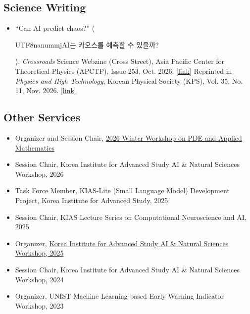 \documentclass[11pt,a4paper]{article}
\begin{document}
\subsection*{Science Writing}

\begin{itemize}[leftmargin=1.5em, topsep=0.2em, itemsep=0.2em]
    \item ``Can AI predict chaos?'' (\begin{CJK}{UTF8}{nanummj}AI는 카오스를 예측할 수 있을까?\end{CJK}), \textit{Crossroads} Science Webzine (Cross Street), Asia Pacific Center for Theoretical Physics (APCTP), Issue 253, Oct. 2026. \href{https://crossroads.apctp.org/cop/bbs/000000000000/selectArticleDetail.do?nttId=4385}{[link]} Reprinted in \textit{Physics and High Technology}, Korean Physical Society (KPS), Vol. 35, No. 11, Nov. 2026. \href{https://webzine.kps.or.kr/?p=5_view&idx=17284}{[link]}
\end{itemize}

\subsection*{Other Services}

\begin{itemize}[leftmargin=1.5em, topsep=0.2em, itemsep=0.2em]
    \item Organizer and Session Chair, \href{https://symposia.kias.re.kr/2026PDEMATH/}{2026 Winter Workshop on PDE and Applied Mathematics}
    
    \item Session Chair, Korea Institute for Advanced Study AI \& Natural Sciences Workshop, 2026
    
    \item Task Force Member, KIAS-Lite (Small Language Model) Development Project, Korea Institute for Advanced Study, 2025
    
    \item Session Chair, KIAS Lecture Series on Computational Neuroscience and AI, 2025
    
    \item Organizer, \href{http://events.kias.re.kr/h/AI2025/}{Korea Institute for Advanced Study AI \& Natural Sciences Workshop, 2025}
    
    \item Session Chair, Korea Institute for Advanced Study AI \& Natural Sciences Workshop, 2024
    
    \item Organizer, UNIST Machine Learning-based Early Warning Indicator Workshop, 2023
\end{itemize}
\end{document}
